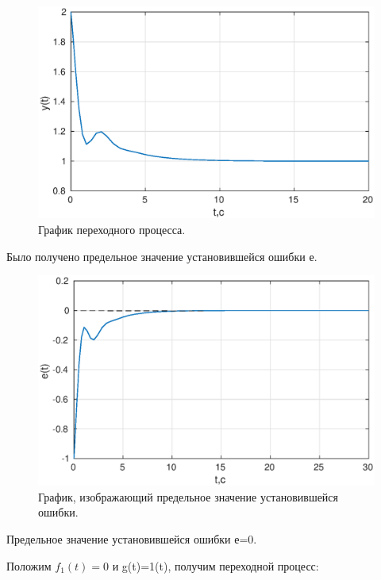 \documentclass[a4paper,14pt]{article}
\begin{document}
\begin{figure}[H]
\centering
\includegraphics[width=\textwidth]{1/3_2y(t).eps}
\caption{График переходного процесса.}
\end{figure}

Было получено предельное значение установившейся ошибки е.

\begin{figure}[H]
\centering
\includegraphics[width=\textwidth]{1/3_2e(t).eps}
\caption{График, изображающий предельное значение установившейся ошибки.}
\end{figure}
Предельное значение установившейся ошибки е=0.

Положим $f_{1}(t)=0$ и g(t)=1(t), получим переходной процесс:
\end{document}

